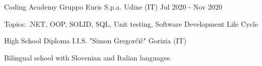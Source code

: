 

\begin{cventries}

\cventry
    {Coding Academy} %
    {Gruppo Euris S.p.a.} %
    {Udine (IT)} %
    {Jul 2020 - Nov 2020} %
    {
      \begin{cvitems} %
        \item {Topics: .NET, OOP, SOLID, SQL, Unit testing, Software Development Life Cycle}
      \end{cvitems}
    }

\cventry
    {High School Diploma} %
    {I.I.S. "Simon Gregorčič"} %
    {Gorizia (IT)} %
    {} %
    {
      \begin{cvitems} %
        \item {Bilingual school with Slovenian and Italian languages.}
      \end{cvitems}
    }
\end{cventries}
